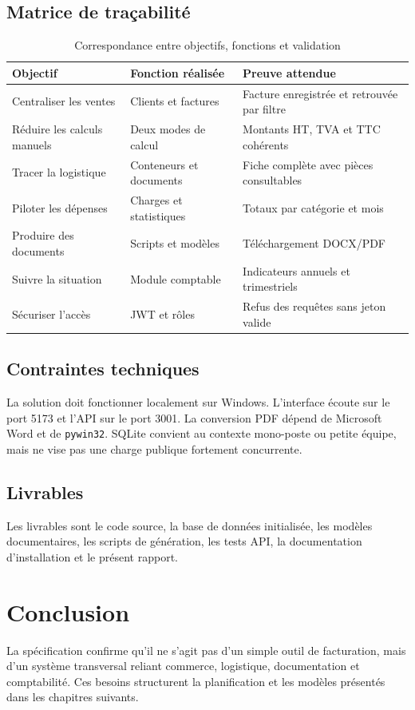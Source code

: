 \documentclass[12pt,a4paper,oneside]{report}
\newcommand{\code}[1]{\texttt{#1}}
\begin{document}
\subsection{Matrice de traçabilité}
\begin{table}[H]\centering
\caption{Correspondance entre objectifs, fonctions et validation}
\begin{tabularx}{\textwidth}{p{3.3cm}Y Y}
\toprule \textbf{Objectif} & \textbf{Fonction réalisée} & \textbf{Preuve attendue}\\ \midrule
Centraliser les ventes & Clients et factures & Facture enregistrée et retrouvée par filtre\\
Réduire les calculs manuels & Deux modes de calcul & Montants HT, TVA et TTC cohérents\\
Tracer la logistique & Conteneurs et documents & Fiche complète avec pièces consultables\\
Piloter les dépenses & Charges et statistiques & Totaux par catégorie et mois\\
Produire des documents & Scripts et modèles & Téléchargement DOCX/PDF\\
Suivre la situation & Module comptable & Indicateurs annuels et trimestriels\\
Sécuriser l'accès & JWT et rôles & Refus des requêtes sans jeton valide\\
\bottomrule
\end{tabularx}
\end{table}

\subsection{Contraintes techniques}
La solution doit fonctionner localement sur Windows. L'interface écoute sur le port 5173 et l'API sur le port 3001. La conversion PDF dépend de Microsoft Word et de \code{pywin32}. SQLite convient au contexte mono-poste ou petite équipe, mais ne vise pas une charge publique fortement concurrente.

\subsection{Livrables}
Les livrables sont le code source, la base de données initialisée, les modèles documentaires, les scripts de génération, les tests API, la documentation d'installation et le présent rapport.

\section*{Conclusion}
La spécification confirme qu'il ne s'agit pas d'un simple outil de facturation, mais d'un système transversal reliant commerce, logistique, documentation et comptabilité. Ces besoins structurent la planification et les modèles présentés dans les chapitres suivants.
\end{document}
